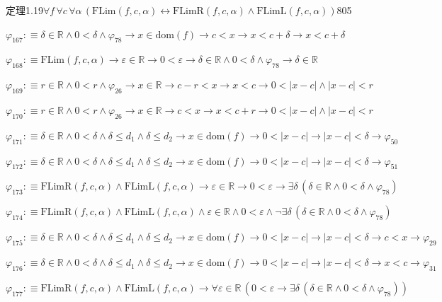 \begin{fullproof}{定理1.19}{$\forall f\,\forall c\,\forall \alpha\,(\mathrm{FLim}(f,c,\alpha) \leftrightarrow \mathrm{FLimR}(f,c,\alpha) \land \mathrm{FLimL}(f,c,\alpha))$}{805}
\begin{abbrevlist}
\item $\varphi_{167} :\equiv \delta \in \mathbb{R} \land 0 < \delta \land \varphi_{78} \to x \in \mathrm{dom}(f) \to c < x \to x < c + \delta \to x < c + \delta$
\item $\varphi_{168} :\equiv \mathrm{FLim}(f,c,\alpha) \to \varepsilon \in \mathbb{R} \to 0 < \varepsilon \to \delta \in \mathbb{R} \land 0 < \delta \land \varphi_{78} \to \delta \in \mathbb{R}$
\item $\varphi_{169} :\equiv r \in \mathbb{R} \land 0 < r \land \varphi_{26} \to x \in \mathbb{R} \to c - r < x \to x < c \to 0 < \lvert x - c \rvert \land \lvert x - c \rvert < r$
\item $\varphi_{170} :\equiv r \in \mathbb{R} \land 0 < r \land \varphi_{26} \to x \in \mathbb{R} \to c < x \to x < c + r \to 0 < \lvert x - c \rvert \land \lvert x - c \rvert < r$
\item $\varphi_{171} :\equiv \delta \in \mathbb{R} \land 0 < \delta \land \delta \leq d_{1} \land \delta \leq d_{2} \to x \in \mathrm{dom}(f) \to 0 < \lvert x - c \rvert \to \lvert x - c \rvert < \delta \to \varphi_{50}$
\item $\varphi_{172} :\equiv \delta \in \mathbb{R} \land 0 < \delta \land \delta \leq d_{1} \land \delta \leq d_{2} \to x \in \mathrm{dom}(f) \to 0 < \lvert x - c \rvert \to \lvert x - c \rvert < \delta \to \varphi_{51}$
\item $\varphi_{173} :\equiv \mathrm{FLimR}(f,c,\alpha) \land \mathrm{FLimL}(f,c,\alpha) \to \varepsilon \in \mathbb{R} \to 0 < \varepsilon \to \exists \delta\,(\delta \in \mathbb{R} \land 0 < \delta \land \varphi_{78})$
\item $\varphi_{174} :\equiv \mathrm{FLimR}(f,c,\alpha) \land \mathrm{FLimL}(f,c,\alpha) \land \varepsilon \in \mathbb{R} \land 0 < \varepsilon \land \neg \exists \delta\,(\delta \in \mathbb{R} \land 0 < \delta \land \varphi_{78})$
\item $\varphi_{175} :\equiv \delta \in \mathbb{R} \land 0 < \delta \land \delta \leq d_{1} \land \delta \leq d_{2} \to x \in \mathrm{dom}(f) \to 0 < \lvert x - c \rvert \to \lvert x - c \rvert < \delta \to c < x \to \varphi_{29}$
\item $\varphi_{176} :\equiv \delta \in \mathbb{R} \land 0 < \delta \land \delta \leq d_{1} \land \delta \leq d_{2} \to x \in \mathrm{dom}(f) \to 0 < \lvert x - c \rvert \to \lvert x - c \rvert < \delta \to x < c \to \varphi_{31}$
\item $\varphi_{177} :\equiv \mathrm{FLimR}(f,c,\alpha) \land \mathrm{FLimL}(f,c,\alpha) \to \forall \varepsilon \in \mathbb{R}\,(0 < \varepsilon \to \exists \delta\,(\delta \in \mathbb{R} \land 0 < \delta \land \varphi_{78}))$

\end{abbrevlist}
\end{fullproof}
